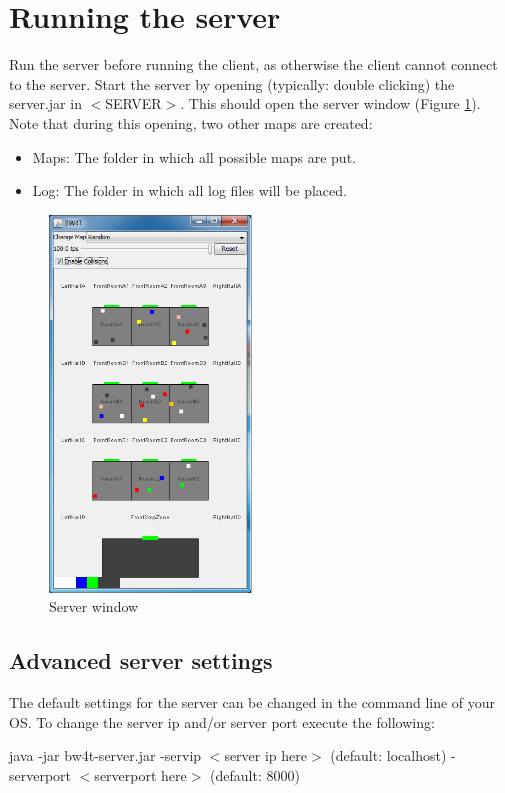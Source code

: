 \documentclass[11pt,a4paper]{article}
\begin{document}
\section{Running the server}
Run the server before running the client, as otherwise the client cannot connect to the server. Start the server by opening (typically: double clicking) the server.jar in $<$SERVER$>$. This should open the server window (Figure  \ref{fig:ServerWindow}). Note that during this opening, two other maps are created: 
\begin{itemize}
\item Maps: The folder in which all possible maps are put.
\item Log: The folder in which all log files will be placed.
\end{itemize}


\begin{figure}[!h]
\begin{center}
   \includegraphics[height=10cm]{server.png}
   \caption{Server window}\label{fig:ServerWindow}
\end{center}
\end{figure}


\subsection{Advanced server settings}
The default settings for the server can be changed in the command line of your OS. To change the server ip and/or server port execute the following:

java -jar bw4t-server.jar -servip $<$server ip here$>$ (default: localhost) -serverport $<$serverport here$>$ (default: 8000)
\end{document}
